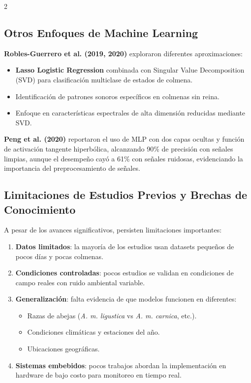 \documentclass[12pt]{report}
\newenvironment{tightmulticols}{%
  \begin{multicols}{2}
  \setlength{\parskip}{1.2pt}
  \linespread{1}\selectfont
}{%
  \end{multicols}
}
\begin{document}
\begin{tightmulticols}

\subsection{Otros Enfoques de Machine Learning}

\noindent \textbf{Robles-Guerrero et al. (2019, 2020)}\cite{robles2019} exploraron diferentes aproximaciones:

\begin{itemize}
    \item \textbf{Lasso Logistic Regression} combinada con Singular Value Decomposition (SVD) para clasificación multiclase de estados de colmena.
    \item Identificación de patrones sonoros específicos en colmenas sin reina.
    \item Enfoque en características espectrales de alta dimensión reducidas mediante SVD.
\end{itemize}

\noindent \textbf{Peng et al. (2020)}\cite{peng2020} reportaron el uso de MLP con dos capas ocultas y función de activación tangente hiperbólica, alcanzando 90\% de precisión con señales limpias, aunque el desempeño cayó a 61\% con señales ruidosas, evidenciando la importancia del preprocesamiento de señales.

\subsection{Limitaciones de Estudios Previos y Brechas de Conocimiento}

\noindent A pesar de los avances significativos, persisten limitaciones importantes:
\begin{enumerate}
    \item \textbf{Datos limitados}: la mayoría de los estudios usan datasets pequeños de pocos días y pocas colmenas.
    \item \textbf{Condiciones controladas}: pocos estudios se validan en condiciones de campo reales con ruido ambiental variable.
    \item \textbf{Generalización}: falta evidencia de que modelos funcionen en diferentes:
    \begin{itemize}
        \item Razas de abejas (\textit{A. m. ligustica} vs \textit{A. m. carnica}, etc.).
        \item Condiciones climáticas y estaciones del año.
        \item Ubicaciones geográficas.
    \end{itemize}
    \item \textbf{Sistemas embebidos}: pocos trabajos abordan la implementación en hardware de bajo costo para monitoreo en tiempo real.
\end{enumerate}


\end{tightmulticols}
\end{document}
